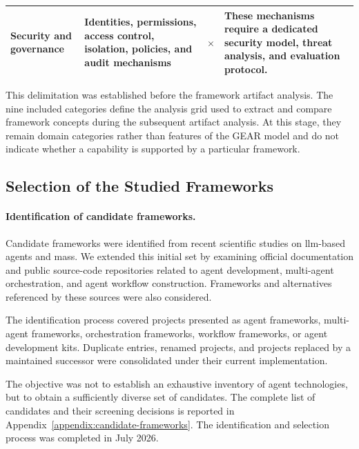 \begin{table}[t]
\begin{tabularx}{\textwidth}{
        @{}
        p{}
        >{\raggedright\arraybackslash}X
        >{\centering\arraybackslash}p{}
        p{}
        @{}
    }
        Security and governance
        & Identities, permissions, access control, isolation, policies, and
        audit mechanisms
        & \(\times\)
        & These mechanisms require a dedicated security model, threat
        analysis, and evaluation protocol. \\

        \bottomrule
    \end{tabularx}
\end{table}

This delimitation was established before the framework artifact analysis. The
nine included categories define the analysis grid used to extract and compare
framework concepts during the subsequent artifact analysis. At this stage,
they remain domain categories rather than features of the GEAR model and do
not indicate whether a capability is supported by a particular framework.

\subsection{Selection of the Studied Frameworks}
\label{subsec:literature-framework-selection}

\paragraph{\textbf{Identification of candidate frameworks.}}
Candidate frameworks were identified from recent scientific studies on
\gls{llm}-based agents and \gls{mas}s. We extended this initial set by examining
official documentation and public source-code repositories related to agent
development, multi-agent orchestration, and agent workflow construction.
Frameworks and alternatives referenced by these sources were also considered.

The identification process covered projects presented as agent frameworks,
multi-agent frameworks, orchestration frameworks, workflow frameworks, or agent
development kits. Duplicate entries, renamed projects, and projects replaced by
a maintained successor were consolidated under their current implementation.

The objective was not to establish an exhaustive inventory of agent
technologies, but to obtain a sufficiently diverse set of candidates. The
complete list of candidates and their screening decisions is reported in
Appendix~\ref{appendix:candidate-frameworks}. The identification and selection
process was completed in July 2026.

